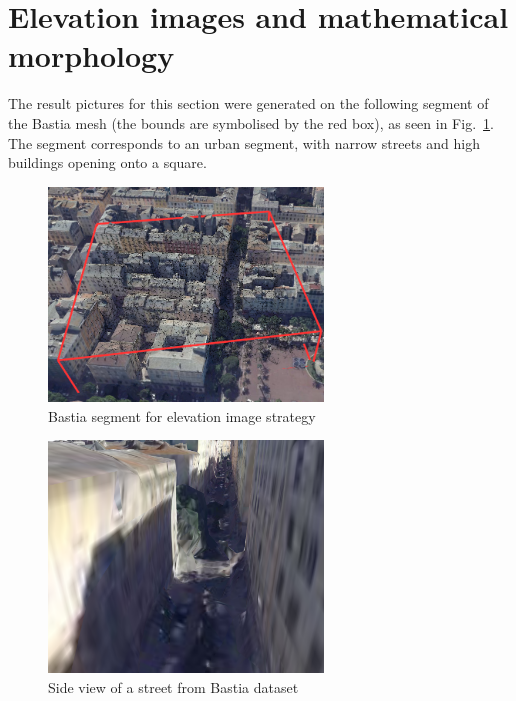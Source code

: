 \documentclass{kththesis}
\begin{document}
\section{Elevation images and mathematical morphology}
The result pictures for this section were generated on the following segment of the Bastia mesh (the bounds are symbolised by the red box), as seen in Fig.~\ref{fig:bastia_mesh}. The segment corresponds to an urban segment, with narrow streets and high buildings opening onto a square.  
\begin{figure}[H]
    \centering
    \includegraphics[width=0.65\textwidth]{images/Results/lod17_mesh.png}
    \caption{Bastia segment for elevation image strategy}
    \label{fig:bastia_mesh}
\end{figure}

\begin{figure}[H]
    \centering
    \includegraphics[width=0.65\textwidth]{images/Results/bastia_side_view.png}
    \caption{Side view of a street from Bastia dataset}
    \label{fig:Bastia_side_view}
\end{figure}
\end{document}
